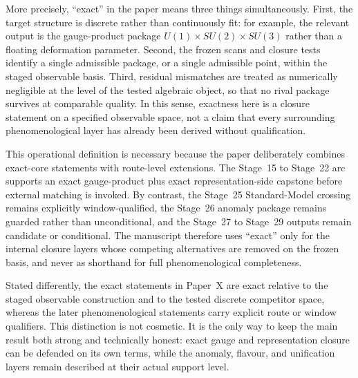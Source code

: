\documentclass[11pt]{article}
\begin{document}
More precisely, ``exact'' in the paper means three things simultaneously. First, the target structure is discrete rather than continuously fit: for example, the relevant output is the gauge-product package $U(1)\times SU(2)\times SU(3)$ rather than a floating deformation parameter. Second, the frozen scans and closure tests identify a single admissible package, or a single admissible point, within the staged observable basis. Third, residual mismatches are treated as numerically negligible at the level of the tested algebraic object, so that no rival package survives at comparable quality. In this sense, exactness here is a closure statement on a specified observable space, not a claim that every surrounding phenomenological layer has already been derived without qualification.

This operational definition is necessary because the paper deliberately combines exact-core statements with route-level extensions. The Stage~15 to Stage~22 arc supports an exact gauge-product plus exact representation-side capstone before external matching is invoked. By contrast, the Stage~25 Standard-Model crossing remains explicitly window-qualified, the Stage~26 anomaly package remains guarded rather than unconditional, and the Stage~27 to Stage~29 outputs remain candidate or conditional. The manuscript therefore uses ``exact'' only for the internal closure layers whose competing alternatives are removed on the frozen basis, and never as shorthand for full phenomenological completeness.

Stated differently, the exact statements in Paper~X are exact relative to the staged observable construction and to the tested discrete competitor space, whereas the later phenomenological statements carry explicit route or window qualifiers. This distinction is not cosmetic. It is the only way to keep the main result both strong and technically honest: exact gauge and representation closure can be defended on its own terms, while the anomaly, flavour, and unification layers remain described at their actual support level.
\end{document}
